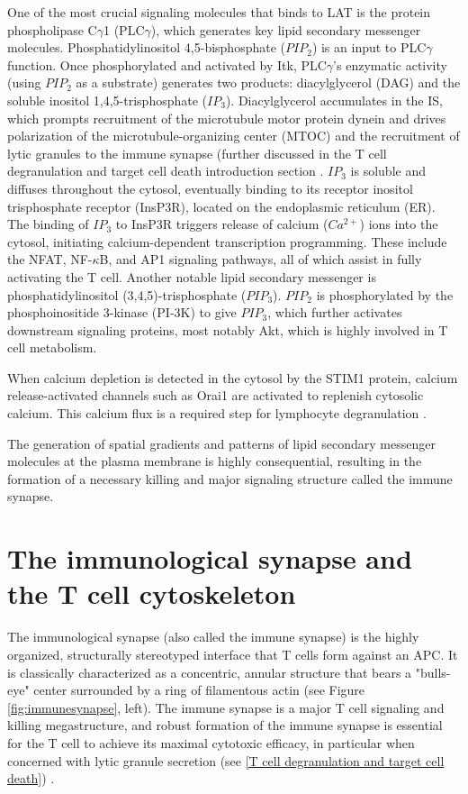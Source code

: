One of the most crucial signaling molecules that binds to LAT is the protein phospholipase C$\gamma$1 (PLC$\gamma$), which generates key lipid secondary messenger molecules. Phosphatidylinositol 4,5-bisphosphate ($PIP_{2}$) is an input to PLC$\gamma$ function. Once phosphorylated and activated by Itk, PLC$\gamma$'s enzymatic activity (using $PIP_{2}$ as a substrate) generates two products: diacylglycerol (DAG) and the soluble inositol 1,4,5-trisphosphate ($IP_{3}$). Diacylglycerol accumulates in the IS, which prompts recruitment of the microtubule motor protein dynein and drives polarization of the microtubule-organizing center (MTOC) \cite{Quann2009} and the recruitment of lytic granules to the immune synapse (further discussed in the T cell degranulation and target cell death introduction section \cite{Stinchcombe2006}. $IP_{3}$ is soluble and diffuses throughout the cytosol, eventually binding to its receptor inositol trisphosphate receptor (InsP3R), located on the endoplasmic reticulum (ER). The binding of $IP_{3}$ to InsP3R triggers release of calcium ($Ca^{2+}$) ions into the cytosol, initiating calcium-dependent transcription programming. These include the NFAT, NF-$\kappa$B, and AP1 signaling pathways, all of which assist in fully activating the T cell. Another notable lipid secondary messenger is phosphatidylinositol (3,4,5)-trisphosphate ($PIP_{3}$). $PIP_{2}$ is phosphorylated by the phosphoinositide 3-kinase (PI-3K) to give $PIP_{3}$, which further activates downstream signaling proteins, most notably Akt, which is highly involved in T cell metabolism.

When calcium depletion is detected in the cytosol by the STIM1 protein, calcium release-activated channels such as Orai1 are activated to replenish cytosolic calcium.  This calcium flux is a required step for lymphocyte degranulation \cite{Maul-Pavicic2011}. 

The generation of spatial gradients and patterns of lipid secondary messenger molecules at the plasma membrane is highly consequential, resulting in the formation of a necessary killing and major signaling structure called the immune synapse. 

\section{The immunological synapse and the T cell cytoskeleton}
\label{The immunological synapse and the T cell cytoskeleton}
The immunological synapse (also called the immune synapse) is the highly organized, structurally stereotyped interface that T cells form against an APC. It is classically characterized as a concentric, annular structure that bears a "bulls-eye" center surrounded by a ring of filamentous actin (see Figure \ref{fig:immunesynapse}, left). The immune synapse is a major T cell signaling and killing megastructure, and robust formation of the immune synapse is essential for the T cell to achieve its maximal cytotoxic efficacy, in particular when concerned with lytic granule secretion (see \ref{T cell degranulation and target cell death}) \cite{Ritter2015}.

